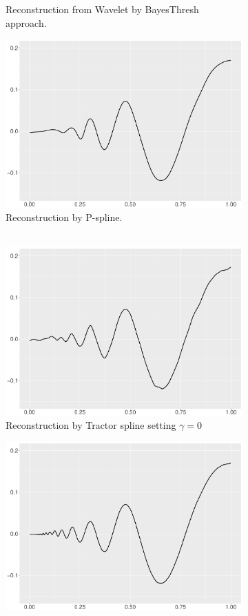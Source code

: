 \begin{figure}
\begin{subfigure}{0.45\textwidth}
    \caption{Reconstruction from Wavelet by BayesThresh approach.}
    \end{subfigure}
    \begin{subfigure}{0.45\textwidth}
    \centering
    \includegraphics[width=\linewidth,height=0.45\textwidth]{Chapters/02TractorSplineTheory/plot/ggplot/ggDopplerPSpline.pdf}
    \caption{Reconstruction by P-spline. \\\mbox{  } }
    \end{subfigure}
    \begin{subfigure}{0.45\textwidth}
    \centering
    \includegraphics[width=\linewidth,height=0.45\textwidth]{Chapters/02TractorSplineTheory/plot/ggplot/ggDopplerGamma.pdf}
    \caption{Reconstruction by Tractor spline setting $\gamma=0$}
    \end{subfigure}
  \begin{subfigure}{0.45\textwidth}
    \centering
    \includegraphics[width=\linewidth,height=0.45\textwidth]{Chapters/02TractorSplineTheory/plot/ggplot/ggDopplerTractorAPT.pdf}

\end{subfigure}
\end{figure}
